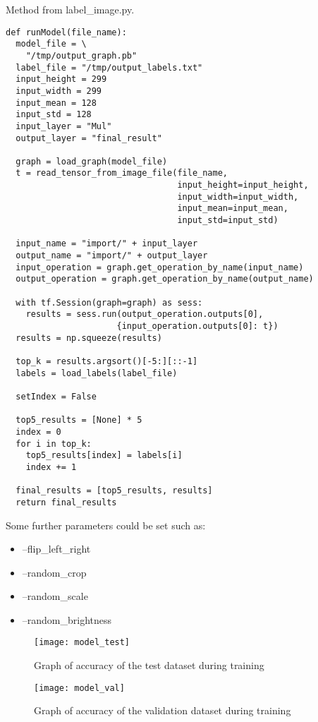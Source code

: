Method from label\_image.py.
\begin{lstlisting}[style=Python]
def runModel(file_name):
  model_file = \
    "/tmp/output_graph.pb"
  label_file = "/tmp/output_labels.txt"
  input_height = 299
  input_width = 299
  input_mean = 128
  input_std = 128
  input_layer = "Mul"
  output_layer = "final_result"

  graph = load_graph(model_file)
  t = read_tensor_from_image_file(file_name,
                                  input_height=input_height,
                                  input_width=input_width,
                                  input_mean=input_mean,
                                  input_std=input_std)

  input_name = "import/" + input_layer
  output_name = "import/" + output_layer
  input_operation = graph.get_operation_by_name(input_name)
  output_operation = graph.get_operation_by_name(output_name)

  with tf.Session(graph=graph) as sess:
    results = sess.run(output_operation.outputs[0],
                      {input_operation.outputs[0]: t})
  results = np.squeeze(results)

  top_k = results.argsort()[-5:][::-1]
  labels = load_labels(label_file)
  
  setIndex = False

  top5_results = [None] * 5
  index = 0
  for i in top_k:
    top5_results[index] = labels[i]
    index += 1

  final_results = [top5_results, results]
  return final_results
\end{lstlisting}

Some further parameters could be set such as:
\begin{itemize}
	\item{--flip\_left\_right}
	\item{--random\_crop}
	\item{--random\_scale}
	\item{--random\_brightness}
\end{itemize}

\begin{figure}
    \texttt{[image: model\_test]}
     \caption{Graph of accuracy of the test dataset during training}
     \label{fig:model_train_test}
\end{figure}

\begin{figure}
    \texttt{[image: model\_val]}
     \caption{Graph of accuracy of the validation dataset during training}
     \label{fig:model_train_val}
\end{figure}

